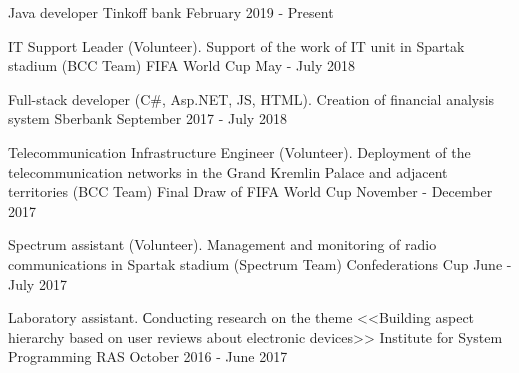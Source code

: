 

\vspace{0cm}\begin{cventries}
\cventry
{Java developer} %
{Tinkoff bank} %
{} %
{February 2019 - Present} %
\noindent	
	
\cventry
{IT Support Leader (Volunteer). Support of the work of IT unit in Spartak stadium (BCC Team)} %
{FIFA World Cup} %
{} %
{May - July 2018} %
\noindent	

\cventry
{Full-stack developer (C\#, Asp.NET, JS, HTML). Creation of financial analysis system} %
{Sberbank} %
{} %
{September 2017 - July 2018} %
\noindent	

\cventry
{Telecommunication Infrastructure Engineer (Volunteer). Deployment of the telecommunication networks in the Grand Kremlin Palace and adjacent territories (BCC Team)} %
{Final Draw of FIFA World Cup} %
{} %
{November - December 2017} %
\noindent	
	
\cventry
{Spectrum assistant (Volunteer). Management and monitoring of radio communications in Spartak stadium (Spectrum Team)} %
{Confederations Cup} %
{} %
{June - July 2017} %
\noindent	




\cventry
{Laboratory assistant. Сonducting research on the theme <<Building aspect hierarchy based on user reviews about electronic devices>>} %
{Institute for System Programming RAS} %
{} %
{October 2016 - June 2017} %
\noindent	



\end{cventries}
